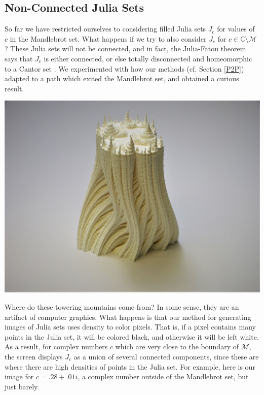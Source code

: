 \documentclass[12 pt]{article}
\newcommand{\bC}{\mathbb{C}}
\newcommand{\cM}{\mathcal{M}}
\begin{document}
\subsection{Non-Connected Julia Sets}
So far we have restricted ourselves to considering filled Julia sets $J_c$ for values of $c$ in the Mandlebrot set.  What happens if we try to also consider $J_c$ for $c\in\bC\setminus\cM$?  These Julia sets will not be connected, and in fact, the Julia-Fatou theorem says that $J_c$ is either connected, or else totally disconnected and homeomorphic to a Cantor set \cite[Theorem 9.5]{Milnor}.  We experimented with how our methods (cf. Section \ref{P2P}) adapted to a path which exited the Mandlebrot set, and obtained a curious result.
\begin{center}
    \includegraphics[width=\textwidth]{images/JuliaDefW1.jpg}
\end{center}
Where do these towering mountains come from?  In some sense, they are an artifact of computer graphics.  What happens is that our method for generating images of Julia sets uses density to color pixels.  That is, if a pixel contains many points in the Julia set, it will be colored black, and otherwise it will be left white.  As a result, for complex numbers $c$ which are very close to the boundary of $\cM$, the screen displays $J_c$ as a union of several connected components, since these are where there are high densities of points in the Julia set.  For example, here is our image for $c=.28+.01i$, a complex number outside of the Mandlebrot set, but just barely.
\end{document}
